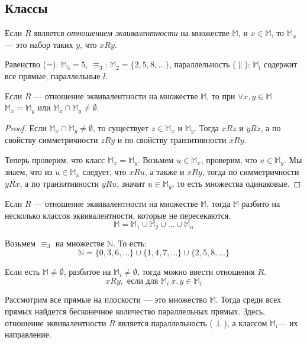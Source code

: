\documentclass[russian]{lecture-notes}
\begin{document}
	\subsection{Классы}
	\begin{definition}
		Если $R$ является \textit{отношением эквивалентности} на множестве $\mathbb{M}$, и $x \in \mathbb{M}$, то $\mathbb{M}_x$ --- это набор таких $y$, что $xRy$.
	\end{definition}
	\begin{example}
		Равенство (\char34=): $\mathbb{M}_5 = {5}$, $\equiv_3$: $\mathbb{M}_2 = \{2, 5, 8, \dots\}$, параллельность ($\parallel$): $\mathbb{M}_l$ содержит все прямые, параллельные $l$.
	\end{example}
	\begin{proposition}
		Если $R$ --- отношение эквивалентности на множестве $\mathbb{M}$, то при $\forall x,y \in \mathbb{M}$ $\mathbb{M}_x = \mathbb{M}_y$ или $\mathbb{M}_x \cap \mathbb{M}_y \neq \emptyset$.
	\end{proposition}
	\begin{proof}
		Если $\mathbb{M}_x \cap \mathbb{M}_y \neq \emptyset$, то существует $z \in \mathbb{M}_x$ и $\mathbb{M}_y$. Тогда $xRz$ и $yRz$, а по свойству симметричности $zRy$ и по свойству транзитивности $xRy$.
		
		Теперь проверим, что класс $\mathbb{M}_x = \mathbb{M}_y$. Возьмем $u \in \mathbb{M}_x$, проверим, что $u \in \mathbb{M}_y$. Мы знаем, что из $u \in \mathbb{M}_x$ следует, что $xRu$, а также и $xRy$, тогда по симметричности $yRx$, а по транзитивности $yRu$, значит $u \in \mathbb{M}_y$, то есть множества одинаковые.
	\end{proof}
	\begin{corollary}
		Если $R$ --- отношение эквивалентности на множестве $\mathbb{M}$, тогда $\mathbb{M}$ разбито на несколько классов эквивалентности, которые не пересекаются.
		$$\mathbb{M} = \mathbb{M}_1 \cup \mathbb{M}_2 \cup \dots \cup \mathbb{M}_n$$
	\end{corollary}
	\begin{example}
		Возьмем $\equiv_3$ на множестве $\mathbb{N}$. То есть:
		$$\mathbb{N} = \{0, 3, 6, \dots\} \cup \{1, 4, 7, \dots\} \cup \{2, 5, 8, \dots\}$$
	\end{example}
	\begin{remark}
		Если есть $\mathbb{M} \neq \emptyset$, разбитое на $\mathbb{M}_i \neq \emptyset$, тогда можно ввести отношения $R$.
		$$xRy,\text{ если для } \mathbb{M}_i~x,y \in \mathbb{M}_i$$
	\end{remark}
	\begin{example}
		Рассмотрим все прямые на плоскости --- это множество $\mathbb{M}$. Тогда среди всех прямых найдется бесконечное количество параллельных прямых. Здесь, отношение эквивалентности $R$ является параллельность ($\perp$), а классом $\mathbb{M}_i$--- их направление.
	\end{example}
	
\end{document}
